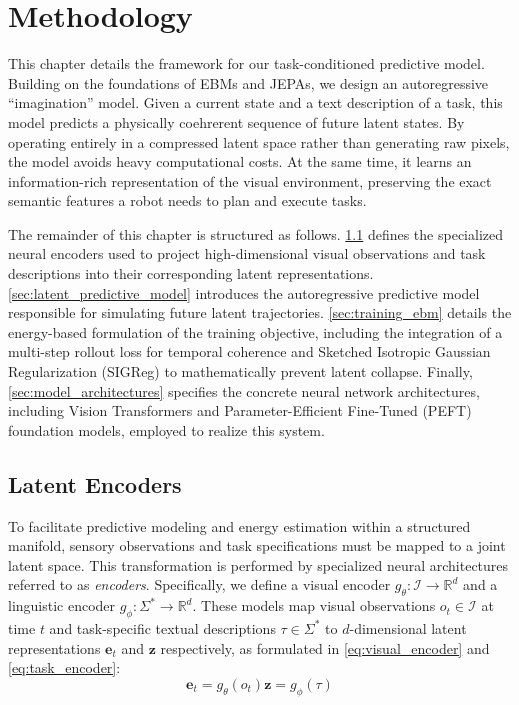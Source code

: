 \chapter{Methodology}
\label{sec:methodology}

This chapter details the framework for our task-conditioned predictive model. Building on the foundations of EBMs and JEPAs, we design an autoregressive ``imagination'' model. Given a current state and a text description of a task, this model predicts a physically coehrerent sequence of future latent states. By operating entirely in a compressed latent space rather than generating raw pixels, the model avoids heavy computational costs. At the same time, it learns an information-rich representation of the visual environment, preserving the exact semantic features a robot needs to plan and execute tasks.

The remainder of this chapter is structured as follows. \cref{sec:latent_encoders} defines the specialized neural encoders used to project high-dimensional visual observations and task descriptions into their corresponding latent representations. \cref{sec:latent_predictive_model} introduces the autoregressive predictive model responsible for simulating future latent trajectories. \cref{sec:training_ebm} details the energy-based formulation of the training objective, including the integration of a multi-step rollout loss for temporal coherence and Sketched Isotropic Gaussian Regularization (SIGReg) to mathematically prevent latent collapse. Finally, \cref{sec:model_architectures} specifies the concrete neural network architectures, including Vision Transformers and Parameter-Efficient Fine-Tuned (PEFT) foundation models, employed to realize this system.

\section{Latent Encoders}
\label{sec:latent_encoders}

To facilitate predictive modeling and energy estimation within a structured manifold, sensory observations and task specifications must be mapped to a joint latent space. This transformation is performed by specialized neural architectures referred to as \textit{encoders}. Specifically, we define a visual encoder $g_\theta: \mathcal{I} \to \mathbb{R}^d$ and a linguistic encoder $g_\phi: \Sigma^\ast \to \mathbb{R}^d$. These models map visual observations $o_t \in \mathcal{I}$ at time $t$ and task-specific textual descriptions $\tau \in \Sigma^\ast$ to $d$-dimensional latent representations $\mathbf{e}_t$ and $\mathbf{z}$ respectively, as formulated in \cref{eq:visual_encoder} and \cref{eq:task_encoder}:
\begin{subequations}
	\begin{equation}
		\mathbf{e}_t  = g_\theta(o_t)
		\label{eq:visual_encoder}
	\end{equation}
	\begin{equation}
		\mathbf{z}    = g_\phi(\tau)
		\label{eq:task_encoder}
	\end{equation}
\end{subequations}

